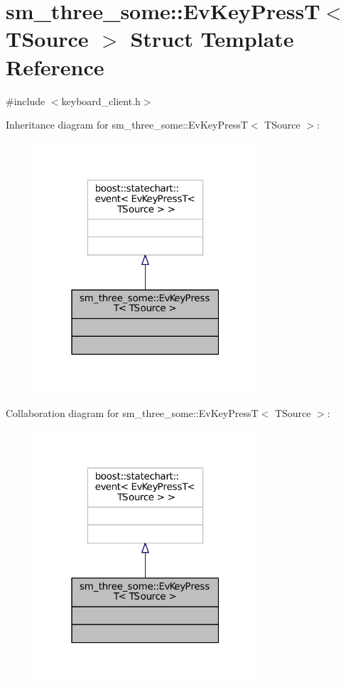 \hypertarget{structsm__three__some_1_1EvKeyPressT}{}\section{sm\+\_\+three\+\_\+some\+:\+:Ev\+Key\+PressT$<$ T\+Source $>$ Struct Template Reference}
\label{structsm__three__some_1_1EvKeyPressT}


{\ttfamily \#include $<$keyboard\+\_\+client.\+h$>$}



Inheritance diagram for sm\+\_\+three\+\_\+some\+:\+:Ev\+Key\+PressT$<$ T\+Source $>$\+:
\nopagebreak
\begin{figure}[H]
\begin{center}
\leavevmode
\includegraphics[width=235pt]{structsm__three__some_1_1EvKeyPressT__inherit__graph}
\end{center}
\end{figure}


Collaboration diagram for sm\+\_\+three\+\_\+some\+:\+:Ev\+Key\+PressT$<$ T\+Source $>$\+:
\nopagebreak
\begin{figure}[H]
\begin{center}
\leavevmode
\includegraphics[width=235pt]{structsm__three__some_1_1EvKeyPressT__coll__graph}
\end{center}
\end{figure}


